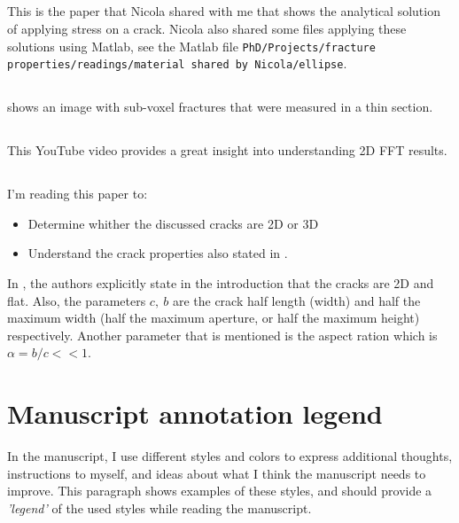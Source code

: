\documentclass[12pt,titlepage]{article}
\begin{document}
\subsection[Maugis (1992)]{\cite{Maugis1992}}
This is the paper that Nicola shared with me that shows the analytical solution of applying stress on a crack. Nicola also shared some files applying these solutions using Matlab, see the Matlab file \texttt{PhD/Projects/fracture properties/readings/material shared by Nicola/ellipse}.
 
\subsection[Ketcham and Carlson (2001)]{\cite{Ketcham2001}} 
\cite[fig. 6]{Ketcham2001} shows an image with sub-voxel fractures that were measured in a thin section.

\subsection[Cohen (2017)]{\cite{Cohen2017}}
This YouTube video provides a great insight into understanding 2D FFT results. 

\subsection[Mavko and Nur (1978)]{\cite{Mavko1978}}
I'm reading this paper to: 
\begin{itemize}
\item Determine whither the discussed cracks are 2D or 3D
\item Understand the crack properties also stated in \cite{Mavko2009}.
\end{itemize}

In \cite{Mavko1978}, the authors explicitly state in the introduction that the cracks are 2D and flat. Also, the parameters $c,~ b$ are the crack half length (width) and half the maximum width (half the maximum aperture, or half the maximum height) respectively. Another parameter that is mentioned is the aspect ration which is $\alpha = b/c << 1$. 
\clearpage
\newpage



\pagebreak
\appendix
{}
\section*{Manuscript annotation legend}
In the manuscript, I use different styles and colors to express additional thoughts, instructions to myself, and ideas about what I think the manuscript needs to improve. This paragraph shows examples of these styles, and should provide a \emph{'legend'} of the used styles while reading the manuscript. 
\end{document}
